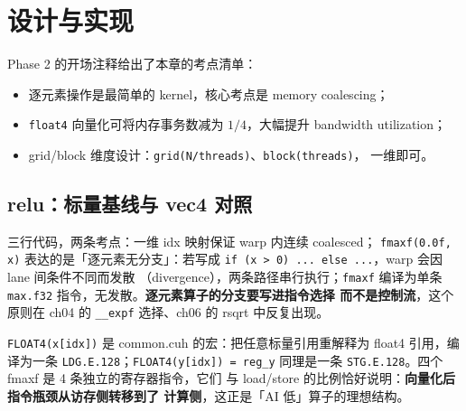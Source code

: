 \section{设计与实现}

Phase 2 的开场注释给出了本章的考点清单：

\begin{itemize}
\item 逐元素操作是最简单的 kernel，核心考点是 memory coalescing；
\item \texttt{float4} 向量化可将内存事务数减为 $1/4$，大幅提升 bandwidth
  utilization；
\item grid/block 维度设计：\texttt{grid(N/threads)}、\texttt{block(threads)}，
  一维即可。
\end{itemize}

\subsection{relu：标量基线与 vec4 对照}



三行代码，两条考点：一维 idx 映射保证 warp 内连续 coalesced；
\texttt{fmaxf(0.0f, x)} 表达的是「逐元素无分支」：若写成
\texttt{if (x > 0) ... else ...}，warp 会因 lane 间条件不同而发散
（divergence），两条路径串行执行；\texttt{fmaxf} 编译为单条
\texttt{max.f32} 指令，无发散。\textbf{逐元素算子的分支要写进指令选择
而不是控制流}，这个原则在 ch04 的 \texttt{\_\_expf} 选择、ch06 的
rsqrt 中反复出现。



\texttt{FLOAT4\allowbreak{}(x[idx])} 是 common.cuh 的宏：把任意标量引用重解释为
float4 引用，编译为一条 \texttt{LDG.E.128}；\texttt{FLOAT4\allowbreak{}(y[idx]) =\allowbreak{} reg\_\allowbreak{}y}
同理是一条 \texttt{STG.E.128}。四个 fmaxf 是 4 条独立的寄存器指令，它们
与 load/store 的比例恰好说明：\textbf{向量化后指令瓶颈从访存侧转移到了
计算侧}，这正是「AI 低」算子的理想结构。

